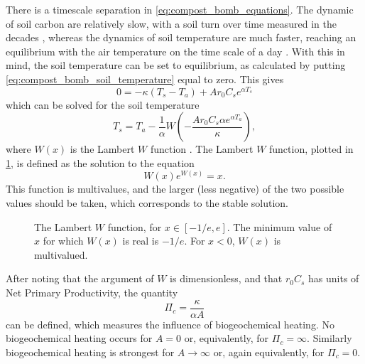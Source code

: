 There is a timescale separation in \cref{eq:compost_bomb_equations}. The dynamic of soil carbon are relatively slow, with a soil turn over time measured in the decades \parencite{Varney2022},
whereas the dynamics of soil temperature are much faster, reaching an equilibrium with the air temperature on the time scale of a day \parencite{Best2005}. With this in mind, the soil
temperature can be set to equilibrium, as calculated by putting \cref{eq:compost_bomb_soil_temperature} equal to zero. This gives
\begin{equation*}
  0 = - \kappa \left(T_s - T_a\right) + Ar_0C_se^{\alpha T_s}
\end{equation*}
which can be solved for the soil temperature
\begin{equation}
  \label{eq:soil_temperature_equilibrium}
  T_s = T_a - \frac{1}{\alpha} W\left(-\frac{Ar_0C_s \alpha e^{\alpha T_a}}{\kappa} \right),
\end{equation}
where $W(x)$ is the Lambert $W$ function \parencite{Corless1996}. The Lambert $W$ function, plotted in \cref{fig:lambert_W}, is defined as the solution to the equation
\begin{equation}
  \label{eq:lambert_W}
  W(x)e^{W(x)} = x.
\end{equation}
This function is multivalues, and the larger (less negative) of the two possible values should be taken, which corresponds to the stable solution.
\begin{figure}
  \centering
  \caption[The Lambert $W$ function]{The Lambert $W$ function, for $x \in [-1/e,e]$. The minimum value of $x$ for which $W(x)$ is real is $-1/e$. For $x < 0$, $W(x)$ is
  multivalued.}
  \label{fig:lambert_W}
\end{figure}

After noting that the argument of $W$ is dimensionless, and that $r_0C_s$ has units of Net Primary Productivity, the quantity 
\begin{equation}
  \label{eq:critical_npp}
  \Pi_c = \frac{\kappa}{\alpha A}
\end{equation}
can be defined, which measures the influence of biogeochemical heating. No biogeochemical heating occurs for $A = 0$ or, equivalently, for $\Pi_c = \infty$. Similarly
biogeochemical heating is strongest for $A \rightarrow \infty$ or, again equivalently, for $\Pi_c = 0$.

